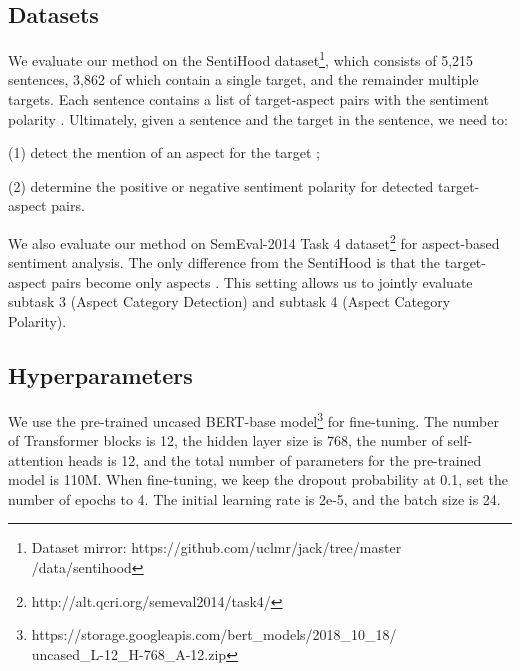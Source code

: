 \documentclass[11pt,a4paper]{article}
\theoremstyle{definition}
\begin{document}
	\subsection{Datasets}
	We evaluate our method on the SentiHood \cite{saeidi2016sentihood} dataset\footnote{Dataset mirror: https://github.com/uclmr/jack/tree/master\\/data/sentihood}, which consists of 5,215 sentences, 3,862 of which contain a single target, and the remainder multiple targets.
	 Each sentence contains a list of target-aspect pairs  with the sentiment polarity . Ultimately, given a sentence  and the target  in the sentence, we need to:
	
	(1) detect the mention of an aspect  for the target ;
	
	(2) determine the positive or negative sentiment polarity  for detected target-aspect pairs.
	
	We also evaluate our method on SemEval-2014 Task 4 \cite{S14-2004} dataset\footnote{http://alt.qcri.org/semeval2014/task4/} for aspect-based sentiment analysis. The only difference from the SentiHood is that the target-aspect pairs  become only aspects . This setting allows us to jointly evaluate subtask 3 (Aspect Category Detection) and subtask 4 (Aspect Category Polarity).
	
	\subsection{Hyperparameters}
	We use the pre-trained uncased BERT-base model\footnote{https://storage.googleapis.com/bert\_models/2018\_10\_18/\\uncased\_L-12\_H-768\_A-12.zip} for fine-tuning. The number of Transformer blocks is 12, the hidden layer size is 768, the number of self-attention heads is 12, and the total number of parameters for the pre-trained model is 110M. When fine-tuning, we keep the dropout probability at 0.1, set the number of epochs to 4. The initial learning rate is 2e-5, and the batch size is 24.
	
\end{document}
